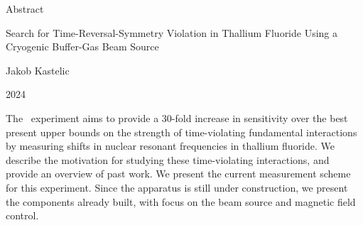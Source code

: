 \begin{center}
    \begin{minipage}{.8\textwidth}
        \centering
        \thispagestyle{empty}

        \vspace{2cm}

        {\large Abstract}

        \vspace{.5cm}

        {\large Search for Time-Reversal-Symmetry Violation in Thallium Fluoride
        Using a Cryogenic Buffer-Gas Beam Source}

        \vspace{.5cm}

        {\large Jakob Kastelic}

        \vspace{.5cm}

        {\large 2024}

    \end{minipage}
\end{center}

\vspace{2cm}

\begin{center}
    \begin{minipage}{.9\textwidth}
        \doublespacing

        \noindent
        The \CENTREX\ experiment aims to provide a 30-fold increase in sensitivity
        over the best present upper bounds on the strength of time-violating
        fundamental interactions by measuring shifts in nuclear resonant frequencies
        in thallium fluoride. We describe the motivation for studying these
        time-violating interactions, and provide an overview of past work. We present
        the current measurement scheme for this experiment. Since the apparatus is
        still under construction, we present the components already built, with
        focus on the beam source and magnetic field control.
    \end{minipage}
\end{center}

\clearpage

